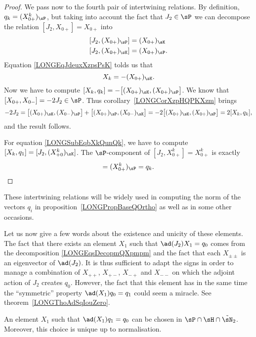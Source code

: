 \begin{proof}
	We pass now to the fourth pair of intertwining relations. By definition, $q_k=(X^k_{0+})_{\sP}$, but taking into account the fact that $J_2\in\sP$ we can decompose the relation $[J_2,X_{0+}]=X_{0+}$ into
	\begin{subequations}
		\begin{align}
			[J_2,(X_{0+})_{\sP}]&=(X_{0+})_{\sK}		\label{LONGEqJdeuxXzpsPsK}\\
			[J_2,(X_{0+})_{\sK}]&=(X_{0+})_{\sP}.
		\end{align}
	\end{subequations}
	Equation \eqref{LONGEqJdeuxXzpsPsK} tolds us that
	\begin{equation}
		X_k=-(X_{0+})_{\sK}.
	\end{equation}
	Now we have to compute $[X_k,q_k]=-\big[ (X_{0+})_{\sK},(X_{0+})_{\sP} \big]$. We know that $[X_{0+},X_{0-}]=-2J_2\in\sP$. Thus corollary~\ref{LONGCorXzpHQPKXzm} brings
	\begin{equation}
		-2J_2=\big[ (X_{0+})_{\sK},(X_{0-})_{\sP} \big]+\big[ (X_{0+})_{\sP},(X_{0-})_{\sK} \big]=-2\big[ (X_{0+})_{\sK},(X_{0+})_{\sP} \big]=2[X_k,q_k],
	\end{equation}
	and the result follows.

	For equation \eqref{LONGSubEqbXkQunQk}, we have to compute $[X_k,q_1]=[J_2,(X_{+0}^k)_{\sK}]$. The $\sP$-component of $[J_2,X_{0+}^k]=X_{0+}^k$ is exactly
	\begin{equation}
		[J_2,(X_{0+}^k)_{\sK}]=(X_{0+}^k)_{\sP}=q_k.
	\end{equation}

\end{proof}

These intertwining relations will be widely used in computing the norm of the vectors $q_i$ in proposition~\ref{LONGPropBaseQOrtho} as well as in some other occasions.

Let us now give a few words about the existence and unicity of these elements. The fact that there exists an element $X_1$ such that $\ad(J_2)X_1=q_0$ comes from the decomposition \eqref{LONGEqsDecopmQXpmpm} and the fact that each $X_{\pm\pm}$ is an eigenvector of $\ad(J_2)$. It is thus sufficient to adapt the signs in order to manage a combination of $X_{++}$, $X_{+-}$, $X_{-+}$ and $X_{--}$ on which the adjoint action of $J_2$ creates $q_0$. However, the fact that this element has in the same time the ``symmetric'' property $\ad(X_1)q_0=q_1$ could seem a miracle. See theorem~\ref{LONGThoAdSqIouZero}.

\begin{lemma}
	An element $X_1$ such that $\ad(X_1)q_1=q_0$ can be chosen in $\sP\cap\sH\cap\tilde\sN_2$. Moreover, this choice is unique up to normalisation.
\end{lemma}

